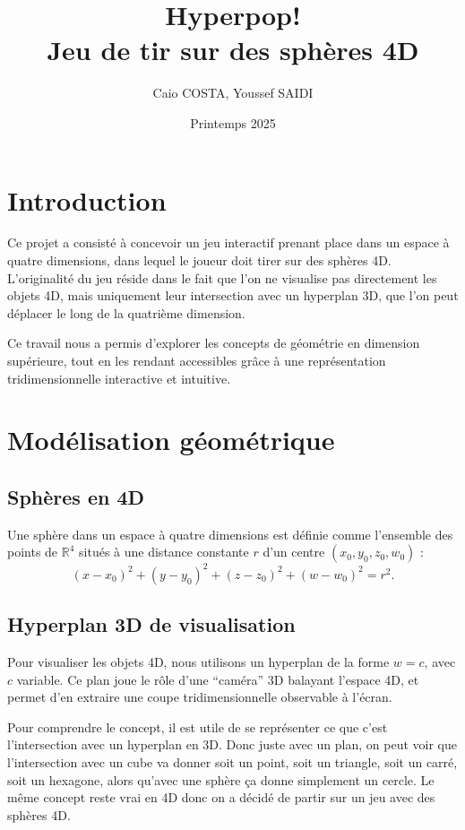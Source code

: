 \documentclass[11pt,a4paper]{article}
\title{Hyperpop! \\ \normalsize{Jeu de tir sur des sphères 4D}}
\author{Caio COSTA, Youssef SAIDI}
\date{Printemps 2025}
\begin{document}
\maketitle

\tableofcontents

\section{Introduction}

Ce projet a consisté à concevoir un jeu interactif prenant place dans un espace à quatre dimensions, dans lequel le joueur doit tirer sur des sphères 4D. L'originalité du jeu réside dans le fait que l'on ne visualise pas directement les objets 4D, mais uniquement leur intersection avec un hyperplan 3D, que l'on peut déplacer le long de la quatrième dimension.

Ce travail nous a permis d'explorer les concepts de géométrie en dimension supérieure, tout en les rendant accessibles grâce à une représentation tridimensionnelle interactive et intuitive.

\section{Modélisation géométrique}

\subsection{Sphères en 4D}

Une sphère dans un espace à quatre dimensions est définie comme l'ensemble des points de $\mathbb{R}^4$ situés à une distance constante $r$ d'un centre $(x_0, y_0, z_0, w_0)$ :
\[
(x - x_0)^2 + (y - y_0)^2 + (z - z_0)^2 + (w - w_0)^2 = r^2.
\]

\subsection{Hyperplan 3D de visualisation}

Pour visualiser les objets 4D, nous utilisons un hyperplan de la forme $w = c$, avec $c$ variable. Ce plan joue le rôle d’une “caméra” 3D balayant l’espace 4D, et permet d’en extraire une coupe tridimensionnelle observable à l’écran.

Pour comprendre le concept, il est utile de se représenter ce que c'est l'intersection avec un hyperplan en 3D. Donc juste avec un plan, on peut voir que l'intersection avec un cube va donner soit un point, soit un triangle, soit un carré, soit un hexagone, alors qu'avec une sphère ça donne simplement un cercle. Le même concept reste vrai en 4D donc on a décidé de partir sur un jeu avec des sphères 4D.
\end{document}
